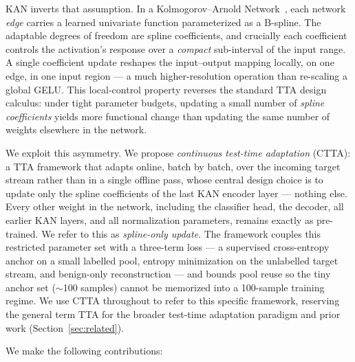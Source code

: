 \documentclass[10pt, conference, letterpaper]{IEEEtran}
\begin{document}
KAN inverts that assumption. In a Kolmogorov--Arnold Network~\cite{liu2024kan}, each network \emph{edge} carries a learned univariate function parameterized as a B-spline. The adaptable degrees of freedom are spline coefficients, and crucially each coefficient controls the activation's response over a \emph{compact} sub-interval of the input range. A single coefficient update reshapes the input--output mapping locally, on one edge, in one input region --- a much higher-resolution operation than re-scaling a global GELU. This local-control property reverses the standard TTA design calculus: under tight parameter budgets, updating a small number of \emph{spline coefficients} yields more functional change than updating the same number of weights elsewhere in the network.

We exploit this asymmetry. We propose \emph{continuous test-time adaptation} (CTTA): a TTA framework that adapts online, batch by batch, over the incoming target stream rather than in a single offline pass, whose central design choice is to update only the spline coefficients of the last KAN encoder layer --- nothing else. Every other weight in the network, including the classifier head, the decoder, all earlier KAN layers, and all normalization parameters, remains exactly as pre-trained. We refer to this as \emph{spline-only update}. The framework couples this restricted parameter set with a three-term loss --- a supervised cross-entropy anchor on a small labelled pool, entropy minimization on the unlabelled target stream, and benign-only reconstruction --- and bounds pool reuse so the tiny anchor set ($\sim$100 samples) cannot be memorized into a 100-sample training regime. We use CTTA throughout to refer to this specific framework, reserving the general term TTA for the broader test-time adaptation paradigm and prior work (Section~\ref{sec:related}).

We make the following contributions:
\end{document}

